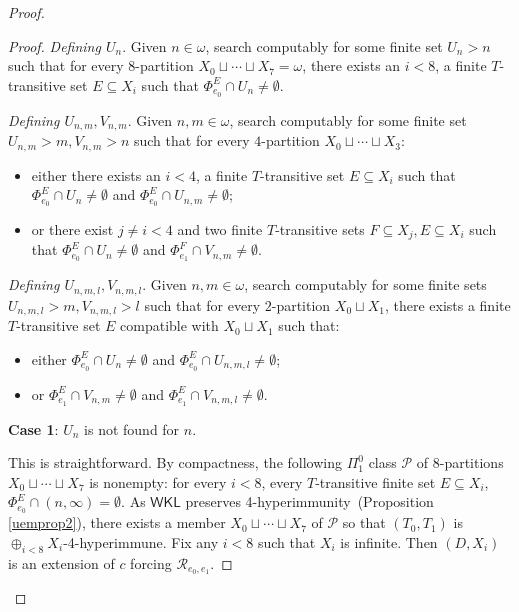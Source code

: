 \documentclass{amsart}
\theoremstyle{definition}
\theoremstyle{remark}
\numberwithin{equation}{section}
\theoremstyle{noparens}
\def\msf{\mathsf}
\def\mcal{\mathcal}
\def\iatfshyp{4-hyperimmune}
\def\propiatfshyp{4-hyperimmunity}
\begin{document}
\begin{proof}
\begin{proof}
\bigskip

\emph{Defining $U_n$}.
Given $n \in \omega$, search computably for some
finite set $U_n>n$ such that
for every $8$-partition
  $X_0\sqcup\cdots\sqcup X_7 = \omega$, there exists an $i< 8$,
  a finite $T$-transitive set $E\subseteq X_i$
  such that  $\Phi_{e_0}^E\cap U_n\ne\emptyset $.
\smallskip

 \emph{Defining $U_{n,m},V_{n,m}$}.
 Given $n,m\in\omega$, search computably for some
 finite set $U_{n,m}>m, V_{n,m}>n$
such that
for every $4$-partition $X_0\sqcup\cdots\sqcup X_3$:
\begin{itemize}
\item [(a)]  either there exists an $i< 4$, a finite $T$-transitive set $E\subseteq X_i$
   such that   $\Phi_{e_0}^{E}\cap U_n \neq \emptyset$ and $\Phi_{e_0}^E\cap U_{n,m}\ne\emptyset$;
  \item [(b)] or there exist $j\ne i<4$ and two finite $T$-transitive
  sets $F\subseteq X_j, E\subseteq X_i$ such that
  $\Phi_{e_0}^E\cap U_n \neq \emptyset$ and $\Phi_{e_1}^{F}\cap V_{n,m}\ne\emptyset$.
  \end{itemize}



 \emph{Defining $U_{n,m,l},V_{n,m,l}$}.
  Given $n,m\in\omega$, search computably for some
 finite sets $U_{n,m,l}>m, V_{n,m,l}>l$
 such that for every $2$-partition $X_0\sqcup X_1$, there exists a   finite $T$-transitive set $E $ compatible with $X_0\sqcup X_1$
  such that:
  \begin{itemize}

  \item [(p)] either   $\Phi_{e_0}^E\cap U_n \neq \emptyset$ and $\Phi_{e_0}^E\cap U_{n,m,l}\ne\emptyset$;

  \item [(q)] or
  $\Phi_{e_1}^E\cap V_{n,m} \neq \emptyset$ and $\Phi_{e_1}^E\cap V_{n,m,l}\ne\emptyset$.
  \end{itemize}
\bigskip

\noindent\textbf{Case 1}: $U_n$ is not found for $n$.


This is straightforward.
By compactness, the following $\Pi_1^0$ class $\mcal{P}$
of $8$-partitions $X_0\sqcup\cdots\sqcup X_7$
is nonempty: for every $i< 8$, every $T$-transitive finite set $E\subseteq
X_i$, $\Phi_{e_0}^E\cap (n,\infty)=\emptyset$.
As $\msf{WKL}$ preserves \propiatfshyp\ (Proposition \ref{uemprop2}),
there exists a  member
$X_0\sqcup\cdots\sqcup X_7$ of $\mcal{P}$
so that $(T_0,T_1)$ is $\oplus_{i<8} X_i$-\iatfshyp.
Fix any $i < 8$ such that $X_i$ is infinite.
Then $(D,X_i) $ is an extension of $c$ forcing
$\mcal{R}_{e_0,e_1}$.




\end{proof}
\end{proof}
\end{document}
